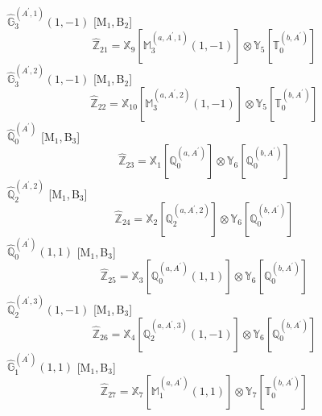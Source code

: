 \documentclass[fleqn,10pt,landscape]{article}
\begin{document}
\begin{itemize}
\noindent {} $\,\,\,\hat{\mathbb{G}}_{3}^{(A^{\prime},1)}(1,-1)$ [M$_{1}$,\,B$_{2}$]
\begin{dmath*}
\hat{\mathbb{Z}}_{21}=\mathbb{X}_{9}[\mathbb{M}_{3}^{(a,A^{\prime},1)}(1,-1)] \otimes\mathbb{Y}_{5}[\mathbb{T}_{0}^{(b,A^{\prime})}]
\end{dmath*}
\vspace{4mm}
\noindent {} $\,\,\,\hat{\mathbb{G}}_{3}^{(A^{\prime},2)}(1,-1)$ [M$_{1}$,\,B$_{2}$]
\begin{dmath*}
\hat{\mathbb{Z}}_{22}=\mathbb{X}_{10}[\mathbb{M}_{3}^{(a,A^{\prime},2)}(1,-1)] \otimes\mathbb{Y}_{5}[\mathbb{T}_{0}^{(b,A^{\prime})}]
\end{dmath*}
\vspace{4mm}
\noindent {} $\,\,\,\hat{\mathbb{Q}}_{0}^{(A^{\prime})}$ [M$_{1}$,\,B$_{3}$]
\begin{dmath*}
\hat{\mathbb{Z}}_{23}=\mathbb{X}_{1}[\mathbb{Q}_{0}^{(a,A^{\prime})}] \otimes\mathbb{Y}_{6}[\mathbb{Q}_{0}^{(b,A^{\prime})}]
\end{dmath*}
\vspace{4mm}
\noindent {} $\,\,\,\hat{\mathbb{Q}}_{2}^{(A^{\prime},2)}$ [M$_{1}$,\,B$_{3}$]
\begin{dmath*}
\hat{\mathbb{Z}}_{24}=\mathbb{X}_{2}[\mathbb{Q}_{2}^{(a,A^{\prime},2)}] \otimes\mathbb{Y}_{6}[\mathbb{Q}_{0}^{(b,A^{\prime})}]
\end{dmath*}
\vspace{4mm}
\noindent {} $\,\,\,\hat{\mathbb{Q}}_{0}^{(A^{\prime})}(1,1)$ [M$_{1}$,\,B$_{3}$]
\begin{dmath*}
\hat{\mathbb{Z}}_{25}=\mathbb{X}_{3}[\mathbb{Q}_{0}^{(a,A^{\prime})}(1,1)] \otimes\mathbb{Y}_{6}[\mathbb{Q}_{0}^{(b,A^{\prime})}]
\end{dmath*}
\vspace{4mm}
\noindent {} $\,\,\,\hat{\mathbb{Q}}_{2}^{(A^{\prime},3)}(1,-1)$ [M$_{1}$,\,B$_{3}$]
\begin{dmath*}
\hat{\mathbb{Z}}_{26}=\mathbb{X}_{4}[\mathbb{Q}_{2}^{(a,A^{\prime},3)}(1,-1)] \otimes\mathbb{Y}_{6}[\mathbb{Q}_{0}^{(b,A^{\prime})}]
\end{dmath*}
\vspace{4mm}
\noindent {} $\,\,\,\hat{\mathbb{G}}_{1}^{(A^{\prime})}(1,1)$ [M$_{1}$,\,B$_{3}$]
\begin{dmath*}
\hat{\mathbb{Z}}_{27}=\mathbb{X}_{7}[\mathbb{M}_{1}^{(a,A^{\prime})}(1,1)] \otimes\mathbb{Y}_{7}[\mathbb{T}_{0}^{(b,A^{\prime})}]
\end{dmath*}

\end{itemize}
\end{document}
